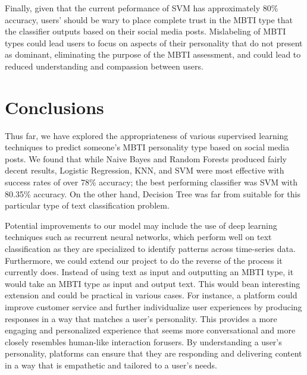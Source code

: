 \documentclass{article}
\begin{document}
Finally, given that the current peformance of SVM has approximately 80\% accuracy, users' should be wary to place complete trust in the MBTI type that the classifier outputs based on their social media posts. Mislabeling of MBTI types could lead users to focus on aspects of their personality that do not present as dominant, eliminating the purpose of the MBTI assessment, and could lead to reduced understanding and compassion between users.

\section{Conclusions}
\label{conclusions}

Thus far, we have explored the appropriateness of various supervised learning techniques to predict someone’s MBTI personality type based on social media posts. We found that while Naive Bayes and Random Forests produced fairly decent results, Logistic Regression, KNN, and SVM were most effective with success rates of over 78\% accuracy; the best performing classifier was SVM with 80.35\% accuracy. On the other hand, Decision Tree was far from suitable for this particular type of text classification problem.

Potential improvements to our model may include the use of deep learning techniques such as recurrent neural networks, which perform well on text classification as they are specialized to identify patterns across time-series data. Furthermore, we could extend our project to do the reverse of the process it currently does. Instead of using text as input and outputting an MBTI type, it would take an MBTI type as input and output text. This would bean interesting extension and could be practical in various cases. For instance, a platform could improve customer service and further individualize user experiences by producing responses in a way that matches a user’s personality. This provides a more engaging and personalized experience that seems more conversational and more closely resembles human-like interaction forusers. By understanding a user’s personality, platforms can ensure that they are responding and delivering content in a way that is empathetic and tailored to a user’s needs.




\end{document}
